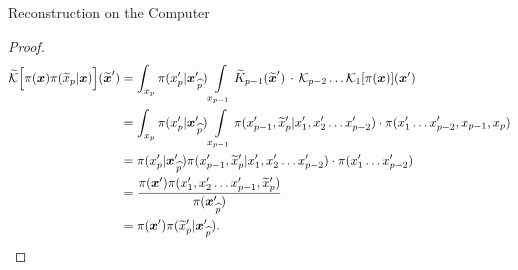 \begin{chapter}{Reconstruction on the Computer}
\begin{proof}
  \begin{align}
    \widetilde{\mathcal K}\Big[ \pi(\mbox{\boldmath$x$})\pi(\widetilde x_p|\mbox{\boldmath$x$})\Big](\widetilde{\mbox{\boldmath$x$}}')
      &= \int_{x_p}\pi(x_p'|\mbox{\boldmath$x$}_{\,\widehat{p}}') \int\limits_{x_{p-1}}\widetilde K_{p-1}(\widetilde{\mbox{\boldmath$x$}}')\,\cdot\,\mathcal K_{p-2}\dots \mathcal K_{1}[\pi(\mbox{\boldmath$x$})](\mbox{\boldmath$x$}')\nonumber \\ 
      &= \int_{x_p}\pi(x_p'|\mbox{\boldmath$x$}_{\,\widehat{p}}') \int\limits_{x_{p-1}}\pi(x_{p-1}',\widetilde x_p'|x_1',x_2'\dots x_{p-2}')\cdot\pi(x_1'\dots x_{p-2}', x_{p-1},x_p)\nonumber \\ 
      &= \pi(x_p'|\mbox{\boldmath$x$}_{\,\widehat{p}}') \pi(x_{p-1}',\widetilde x_p'|x_1',x_2'\dots x_{p-2}')\cdot\pi(x_1'\dots x_{p-2}')\nonumber \\ 
      &= \frac{\pi(\mbox{\boldmath$x$}')\pi(x_1',x_2'\dots x_{p-1}', \widetilde x_p')}{\pi(\mbox{\boldmath$x$}_{\,\widehat{p}}')}\nonumber \\ 
      &= \pi(\mbox{\boldmath$x$}')\pi(\widetilde x_p'|\mbox{\boldmath$x$}_{\,\widehat{p}}').
  \end{align}

\end{proof}
\end{chapter}
